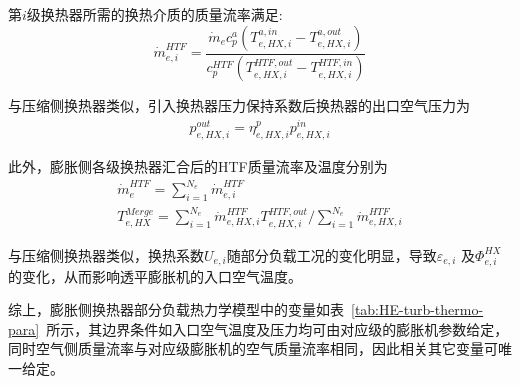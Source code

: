 第$i$级换热器所需的换热介质的质量流率满足:
\begin{equation}
\label{equ:he-turb-mass-flow}
\dot m_{e,i}^{HTF} = \frac{{{{\dot m}_e}c_p^a({T_{e,HX,i}^{a,in} - T_{e,HX,i}^{a,out}})}}{{c_p^{HTF}({T_{e,HX,i}^{HTF,out} - T_{e,HX,i}^{HTF,in}})}}
\end{equation}

与压缩侧换热器类似，引入换热器压力保持系数\cite{Thesis-Lixuemei}后换热器的出口空气压力为
\begin{subequations}
\begin{gather}
p_{e,HX,i}^{out} = \eta _{e,HX,i}^pp_{e,HX,i}^{in}\label{equ:he-turb-pressure-out}
\end{gather}
\end{subequations}

此外，膨胀侧各级换热器汇合后的HTF质量流率及温度分别为
\begin{subequations}
\begin{gather}
\dot m_e^{HTF} = \sum\limits_{i = 1}^{{N_e}} {\dot m_{e,i}^{HTF}} \label{equ:he-turb-mix-mass-flow}\\
T_{e,HX}^{Merge} = {{\sum\limits_{i = 1}^{{N_e}} {\dot m_{e,HX,i}^{HTF}T_{e,HX,i}^{HTF,out}} }}/{{\sum\limits_{i = 1}^{{N_e}} {\dot m_{e,HX,i}^{HTF}} }}\label{equ:he-turb-mix-temp}
\end{gather}
\end{subequations}

与压缩侧换热器类似，换热系数$U_{e,i}$随部分负载工况的变化明显，导致${\varepsilon _{e,i}}$ 及$\Phi _{e,i}^{HX}$的变化，从而影响透平膨胀机的入口空气温度。

综上，膨胀侧换热器部分负载热力学模型中的变量如表~\ref{tab:HE-turb-thermo-para}~所示，其边界条件如入口空气温度及压力均可由对应级的膨胀机参数给定，同时空气侧质量流率与对应级膨胀机的空气质量流率相同，因此相关其它变量可唯一给定。

